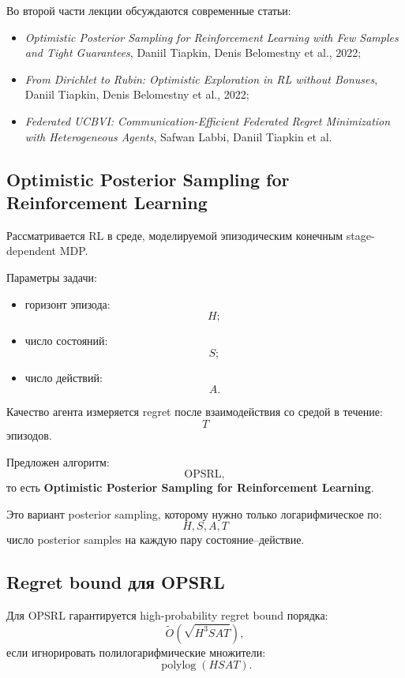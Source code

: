 \documentclass[12pt,a4paper]{article}
\begin{document}
Во второй части лекции обсуждаются современные статьи:

\begin{itemize}
    \item \textit{Optimistic Posterior Sampling for Reinforcement Learning with Few Samples and Tight Guarantees}, Daniil Tiapkin, Denis Belomestny et al., 2022;
    \item \textit{From Dirichlet to Rubin: Optimistic Exploration in RL without Bonuses}, Daniil Tiapkin, Denis Belomestny et al., 2022;
    \item \textit{Federated UCBVI: Communication-Efficient Federated Regret Minimization with Heterogeneous Agents}, Safwan Labbi, Daniil Tiapkin et al.
\end{itemize}

\subsection{Optimistic Posterior Sampling for Reinforcement Learning}

Рассматривается RL в среде, моделируемой эпизодическим конечным stage-dependent MDP.

Параметры задачи:
\begin{itemize}
    \item горизонт эпизода:
    \[
    H;
    \]
    \item число состояний:
    \[
    S;
    \]
    \item число действий:
    \[
    A.
    \]
\end{itemize}

Качество агента измеряется regret после взаимодействия со средой в течение:
\[
T
\]
эпизодов.

Предложен алгоритм:
\[
\text{OPSRL},
\]
то есть \textbf{Optimistic Posterior Sampling for Reinforcement Learning}.

Это вариант posterior sampling, которому нужно только логарифмическое по:
\[
H,S,A,T
\]
число posterior samples на каждую пару состояние--действие.

\subsection{Regret bound для OPSRL}

Для OPSRL гарантируется high-probability regret bound порядка:
\[
\widetilde O
\left(
\sqrt{H^3SAT}
\right),
\]
если игнорировать полилогарифмические множители:
\[
\operatorname{polylog}(HSAT).
\]
\end{document}
